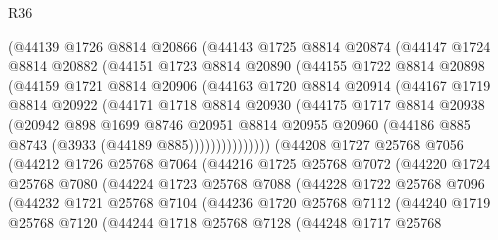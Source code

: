 \begin{lexlean}{R36}
\begin{coremodule}
          (@44139
            @1726
            @8814
            @20866
            (@44143
              @1725
              @8814
              @20874
              (@44147
                @1724
                @8814
                @20882
                (@44151
                  @1723
                  @8814
                  @20890
                  (@44155
                    @1722
                    @8814
                    @20898
                    (@44159
                      @1721
                      @8814
                      @20906
                      (@44163
                        @1720
                        @8814
                        @20914
                        (@44167
                          @1719
                          @8814
                          @20922
                          (@44171
                            @1718
                            @8814
                            @20930
                            (@44175
                              @1717
                              @8814
                              @20938
                              (@20942
                                @898
                                @1699
                                @8746
                                @20951
                                @8814
                                @20955
                                @20960
                                (@44186 @885 @8743 (@3933 (@44189 @885)))))))))))))))
        (@44208
          @1727
          @25768
          @7056
          (@44212
            @1726
            @25768
            @7064
            (@44216
              @1725
              @25768
              @7072
              (@44220
                @1724
                @25768
                @7080
                (@44224
                  @1723
                  @25768
                  @7088
                  (@44228
                    @1722
                    @25768
                    @7096
                    (@44232
                      @1721
                      @25768
                      @7104
                      (@44236
                        @1720
                        @25768
                        @7112
                        (@44240
                          @1719
                          @25768
                          @7120
                          (@44244
                            @1718
                            @25768
                            @7128
                            (@44248
                              @1717
                              @25768

\end{coremodule}
\end{lexlean}
